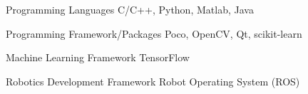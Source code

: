 


\begin{cvskills}


\cvskill
{Programming Languages} %
{C/C++, Python, Matlab, Java} %


\cvskill
{Programming Framework/Packages}
{Poco, OpenCV, Qt, scikit-learn}


\cvskill
{Machine Learning Framework} %
{TensorFlow} %





\cvskill
{Robotics Development Framework}
{Robot Operating System (ROS)}


\end{cvskills}